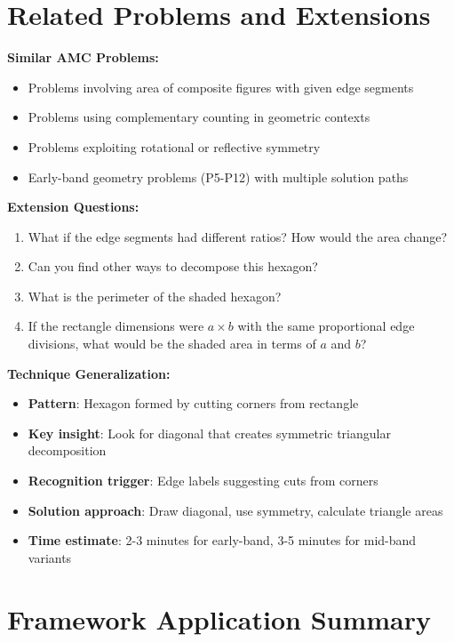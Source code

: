 \documentclass[11pt]{article}
\begin{document}
\section*{Related Problems and Extensions}

\textbf{Similar AMC Problems:}
\begin{itemize}
    \item Problems involving area of composite figures with given edge segments
    \item Problems using complementary counting in geometric contexts
    \item Problems exploiting rotational or reflective symmetry
    \item Early-band geometry problems (P5-P12) with multiple solution paths
\end{itemize}

\textbf{Extension Questions:}
\begin{enumerate}
    \item What if the edge segments had different ratios? How would the area change?
    \item Can you find other ways to decompose this hexagon?
    \item What is the perimeter of the shaded hexagon?
    \item If the rectangle dimensions were $a \times b$ with the same proportional edge divisions, what would be the shaded area in terms of $a$ and $b$?
\end{enumerate}

\textbf{Technique Generalization:}
\begin{itemize}
    \item \textbf{Pattern}: Hexagon formed by cutting corners from rectangle
    \item \textbf{Key insight}: Look for diagonal that creates symmetric triangular decomposition
    \item \textbf{Recognition trigger}: Edge labels suggesting cuts from corners
    \item \textbf{Solution approach}: Draw diagonal, use symmetry, calculate triangle areas
    \item \textbf{Time estimate}: 2-3 minutes for early-band, 3-5 minutes for mid-band variants
\end{itemize}

\section*{Framework Application Summary}
\end{document}
